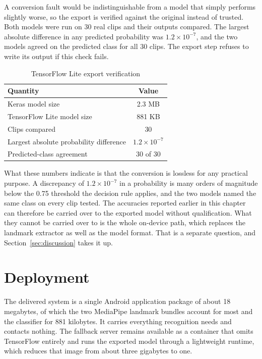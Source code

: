 A conversion fault would be indistinguishable from a model that simply performs slightly worse, so the export is verified against the original instead of trusted. Both models were run on 30 real clips and their outputs compared. The largest absolute difference in any predicted probability was $1.2 \times 10^{-7}$, and the two models agreed on the predicted class for all 30 clips. The export step refuses to write its output if this check fails.

\begin{table}[htbp]
    \centering
    \caption{TensorFlow Lite export verification}
    \label{tab:export}
    \begin{tabular}{lc}
        \toprule
        \textbf{Quantity} & \textbf{Value} \\
        \midrule
        Keras model size & 2.3 MB \\
        TensorFlow Lite model size & 881 KB \\
        Clips compared & 30 \\
        Largest absolute probability difference & $1.2 \times 10^{-7}$ \\
        Predicted-class agreement & 30 of 30 \\
        \bottomrule
    \end{tabular}
\end{table}

\noindent What these numbers indicate is that the conversion is lossless for any practical purpose. A discrepancy of $1.2 \times 10^{-7}$ in a probability is many orders of magnitude below the 0.75 threshold the decision rule applies, and the two models named the same class on every clip tested. The accuracies reported earlier in this chapter can therefore be carried over to the exported model without qualification. What they cannot be carried over to is the whole on-device path, which replaces the landmark extractor as well as the model format. That is a separate question, and Section~\ref{sec:discussion} takes it up.

\section{Deployment}
\label{sec:deployment}

The delivered system is a single Android application package of about 18 megabytes, of which the two MediaPipe landmark bundles account for most and the classifier for 881 kilobytes. It carries everything recognition needs and contacts nothing. The fallback server remains available as a container that omits TensorFlow entirely and runs the exported model through a lightweight runtime, which reduces that image from about three gigabytes to one.

